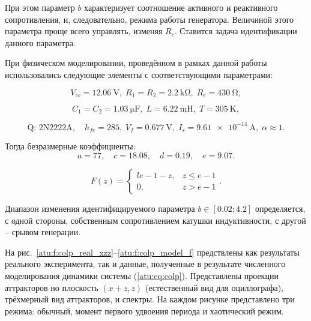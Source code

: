 При этом параметр $b$ характеризует соотношение
активного и реактивного сопротивления,
и, следовательно, режима работы генератора.
Величиной этого параметра проще всего управлять,
изменяя $R_c$.
Ставится задача идентификации данного параметра.

При физическом моделировании, проведённом в рамках данной работы использовались следующие
элементы с соответствующими параметрами:

\[
  V_{cc} = \SI{12.06}{\volt},          \;
  R_1 = R_2 = \SI{2.2}{\kilo\ohm},     \;
  R_e = \SI{430}{\ohm},
\]

\[
  C_1 = C_2 = \SI{1.03}{\micro\farad}, \;
  L = \SI{6.22}{\milli\henry},         \;
  T = \SI{305}{\kelvin},
\]

\[
  \text{Q: 2N2222A}, \quad
  h_{fe}=285, \;
  V_f = \SI{0.677}{\volt}, \;
  I_s = \SI{9.61e-14}{\ampere}, \;
  \alpha \approx 1.
\]

Тогда безразмерные коэффициенты:
\[
 a = 77,     \quad
 c = 18.08,  \quad
 d = 0.19,   \quad
 e = 9.07.
\]

\[
F(z) =
\begin{cases}{l}
  e-1-z, & z \le e-1  \\
  0,     & z  >  e-1
\end{cases}.
\]


Диапазон изменения идентифицируемого параметра
$b \in [ 0.02; 4.2 ]$
определяется, с одной стороны, собственным сопротивлением катушки индуктивности,
с другой -- срывом генерации.


На рис.~\ref{atu:f:colp_real_xzz}--\ref{atu:f:colp_model_f} предствлены как результаты реального эксперимента,
так и данные, полученные в результате численного моделирования динамики системы (\ref{atu:eq:colp}).
Представлены проекции аттракторов но плоскость $(x+z,z)$ (естественный вид для оциллографа),
трёхмерный вид аттракторов, и спектры.
На каждом рисунке представлено три режима: обычный, момент первого удвоения периода и хаотический режим.


